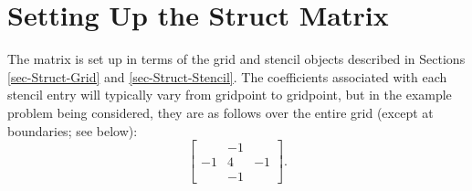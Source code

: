 \section{Setting Up the Struct Matrix}
\label{sec-Struct-Matrix}

The matrix is set up in terms of the grid and stencil objects described in
Sections \ref{sec-Struct-Grid} and \ref{sec-Struct-Stencil}.  The coefficients
associated with each stencil entry will typically vary from gridpoint to
gridpoint, but in the example problem being considered, they are as follows
over the entire grid (except at boundaries; see below):
\begin{equation}\label{eqn-stencil-laplacian}
\left [
\begin{array}{ccc}
    & -1 &    \\
 -1 &  4 & -1 \\
    & -1 &    
\end{array}
\right ] .
\end{equation}

